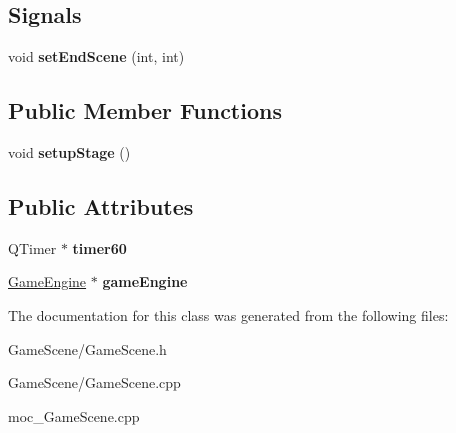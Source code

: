 \subsection*{Signals}
\begin{DoxyCompactItemize}
\item 
void {\bfseries set\+End\+Scene} (int, int)\hypertarget{classGameScene_a134cbab1d01f474d1899d2d4b35fe16c}{}\label{classGameScene_a134cbab1d01f474d1899d2d4b35fe16c}

\end{DoxyCompactItemize}
\subsection*{Public Member Functions}
\begin{DoxyCompactItemize}
\item 
void {\bfseries setup\+Stage} ()\hypertarget{classGameScene_a9de3918bb8c2b241bc67a260e7c579af}{}\label{classGameScene_a9de3918bb8c2b241bc67a260e7c579af}

\end{DoxyCompactItemize}
\subsection*{Public Attributes}
\begin{DoxyCompactItemize}
\item 
Q\+Timer $\ast$ {\bfseries timer60}\hypertarget{classGameScene_af6fc4df0ed326e09aa974df571c22288}{}\label{classGameScene_af6fc4df0ed326e09aa974df571c22288}

\item 
\hyperlink{classGameEngine}{Game\+Engine} $\ast$ {\bfseries game\+Engine}\hypertarget{classGameScene_a129381cd74fb68cfaeccd96a5ecc4ad7}{}\label{classGameScene_a129381cd74fb68cfaeccd96a5ecc4ad7}

\end{DoxyCompactItemize}


The documentation for this class was generated from the following files\+:\begin{DoxyCompactItemize}
\item 
Game\+Scene/Game\+Scene.\+h\item 
Game\+Scene/Game\+Scene.\+cpp\item 
moc\+\_\+\+Game\+Scene.\+cpp\end{DoxyCompactItemize}
